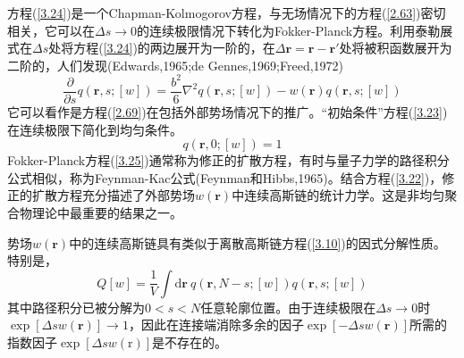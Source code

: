 方程(\ref{3.24})是一个Chapman-Kolmogorov方程，与无场情况下的方程(\ref{2.63})密切相关，它可以在$\Delta s\rightarrow 0$的连续极限情况下转化为Fokker-Planck方程。利用泰勒展式在$\Delta s$处将方程(\ref{3.24})的两边展开为一阶的，在$\Delta\mathbf{r}=\mathbf{r}-\mathbf{r}'$处将被积函数展开为二阶的，人们发现(Edwards,1965;de Gennes,1969;Freed,1972)
\begin{equation}\label{3.25}
\frac{\partial}{\partial s}q(\mathbf{r},s;[w])=\frac{b^2}{6}\nabla^2q(\mathbf{r},s;[w])-w(\mathbf{r})q(\mathbf{r},s;[w])
\end{equation}
它可以看作是方程(\ref{2.69})在包括外部势场情况下的推广。“初始条件”方程(\ref{3.23})在连续极限下简化到均匀条件。
\begin{equation}\label{3.26}
q(\mathbf{r},0;[w])=1
\end{equation}
Fokker-Planck方程(\ref{3.25})通常称为修正的扩散方程，有时与量子力学的路径积分公式相似，称为Feynman-Kac公式(Feynman和Hibbs,1965)。结合方程(\ref{3.22})，修正的扩散方程充分描述了外部势场$w(\mathbf{r})$中连续高斯链的统计力学。这是非均匀聚合物理论中最重要的结果之一。

势场$w(\mathbf{r})$中的连续高斯链具有类似于离散高斯链方程(\ref{3.10})的因式分解性质。特别是，
\begin{equation}\label{3.27}
Q[w]=\frac{1}{V}\int\mathrm{d}\mathbf{r}~q(\mathbf{r},N-s;[w])q(\mathbf{r},s;[w])
\end{equation}
其中路径积分已被分解为$0<s<N$任意轮廓位置。由于连续极限在$\Delta s\rightarrow 0$时$\exp[\Delta sw(\mathbf{r})]\rightarrow 1$，因此在连接端消除多余的因子$\exp[-\Delta sw(\mathbf{r})]$所需的指数因子$\exp[\Delta sw(\mathrm{r})]$是不存在的。

